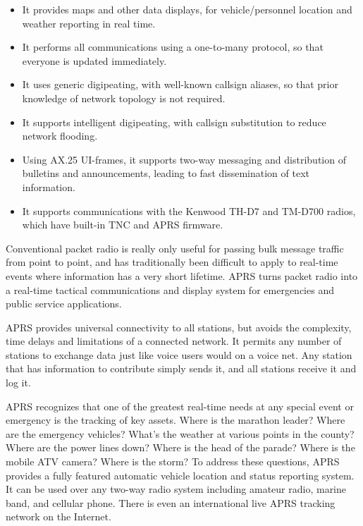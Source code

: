 \documentclass{scrreprt}[letter]
\begin{document}
\begin{itemize}

\item It provides maps and other data displays, for vehicle/personnel location
and weather reporting in real time.

\item It performs all communications using a one-to-many protocol, so that
everyone is updated immediately.

\item It uses generic digipeating, with well-known callsign aliases, so that prior
knowledge of network topology is not required.

\item It supports intelligent digipeating, with callsign substitution to reduce
network flooding.

\item Using AX.25 UI-frames, it supports two-way messaging and distribution
of bulletins and announcements, leading to fast dissemination of text
information.

\item It supports communications with the Kenwood TH-D7 and TM-D700
radios, which have built-in TNC and APRS firmware.

\end{itemize}

Conventional packet radio is really only useful for passing bulk message
traffic from point to point, and has traditionally been difficult to apply to
real-time events where information has a very short lifetime. APRS turns
packet radio into a real-time tactical communications and display system for
emergencies and public service applications.

APRS provides universal connectivity to all stations, but avoids the
complexity, time delays and limitations of a connected network. It permits
any number of stations to exchange data just like voice users would on a
voice net. Any station that has information to contribute simply sends it, and
all stations receive it and log it.

APRS recognizes that one of the greatest real-time needs at any special event
or emergency is the tracking of key assets. Where is the marathon leader?
Where are the emergency vehicles? What’s the weather at various points in
the county? Where are the power lines down? Where is the head of the
parade? Where is the mobile ATV camera? Where is the storm?
To address these questions, APRS provides a fully featured automatic
vehicle location and status reporting system. It can be used over any two-way
radio system including amateur radio, marine band, and cellular phone. There
is even an international live APRS tracking network on the Internet.
\end{document}
